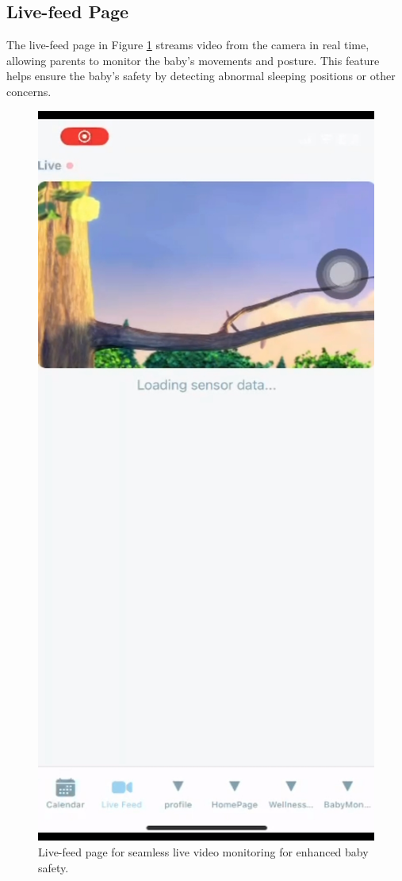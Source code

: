 \documentclass[12pt,a4paper]{report}
\begin{document}
\subsection{Live-feed Page}
The live-feed page in Figure \ref{fig:live-feed} streams video from the camera in real time, allowing parents to monitor the baby's movements and posture. This feature helps ensure the baby's safety by detecting abnormal sleeping positions or other concerns.
\begin{figure}[H]
  \centering
  \includegraphics[scale=0.15]{./pic/live-feed.jpeg}
  \caption{Live-feed page for seamless live video monitoring for enhanced baby safety.}
  \label{fig:live-feed}
\end{figure}
\end{document}
